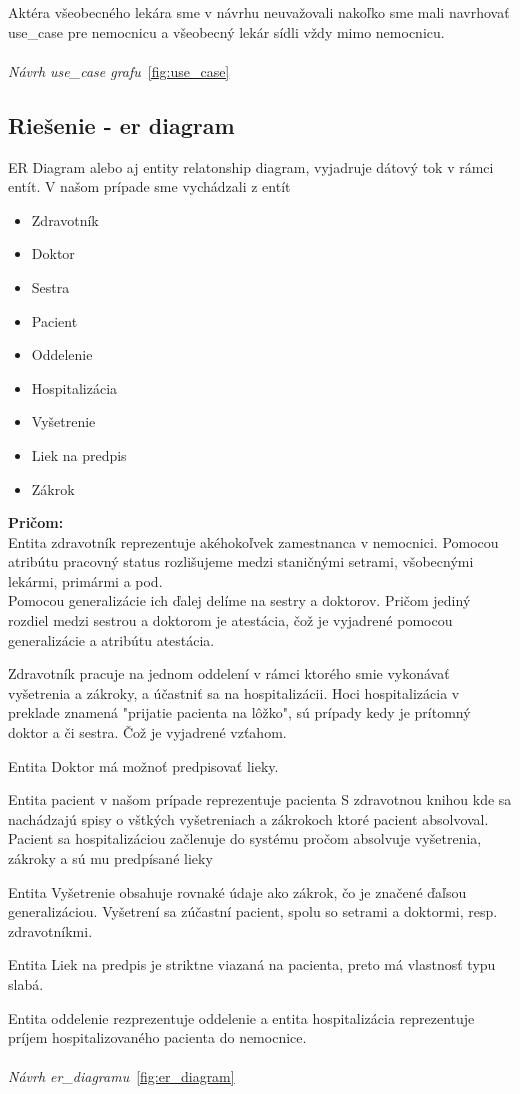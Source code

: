 Aktéra všeobecného lekára sme v návrhu neuvažovali nakoľko sme mali navrhovať use\_case pre nemocnicu a všeobecný lekár
sídli vždy mimo nemocnicu.
\\\\
\textit{Návrh use\_case grafu}~\ref{fig:use_case}

\subsection{Riešenie - er diagram}
ER Diagram alebo aj entity relatonship diagram, vyjadruje dátový tok v rámci entít.
V našom prípade sme vychádzali z entít

\begin{itemize}
    \item Zdravotník
    \item Doktor
    \item Sestra
    \item Pacient
    \item Oddelenie
    \item Hospitalizácia
    \item Vyšetrenie
    \item Liek na predpis
    \item Zákrok
\end{itemize}

\noindent\textbf{Pričom:} \\
\indent Entita zdravotník reprezentuje akéhokoľvek zamestnanca v nemocnici. Pomocou atribútu pracovný status rozlišujeme medzi staničnými setrami,
všobecnými lekármi, primármi a pod. \\
Pomocou generalizácie ich ďalej delíme na sestry a doktorov. Pričom jediný rozdiel medzi sestrou a doktorom je atestácia, čož
je vyjadrené pomocou generalizácie a atribútu atestácia.

Zdravotník pracuje na jednom oddelení v rámci ktorého smie vykonávať vyšetrenia a zákroky, a účastniť sa na hospitalizácii.
Hoci hospitalizácia v preklade znamená "prijatie pacienta na lôžko", sú prípady kedy je prítomný doktor a či sestra. Čož
je vyjadrené vzťahom.

Entita Doktor má možnoť predpisovať lieky.

Entita pacient v našom prípade reprezentuje pacienta S zdravotnou knihou kde sa nachádzajú spisy o vštkých vyšetreniach a zákrokoch ktoré pacient
absolvoval.
Pacient sa hospitalizáciou začlenuje do systému pročom absolvuje vyšetrenia, zákroky a sú mu predpísané lieky

Entita Vyšetrenie obsahuje rovnaké údaje ako zákrok, čo je značené ďaľsou generalizáciou.
Vyšetrení sa zúčastní pacient, spolu so setrami a doktormi, resp. zdravotníkmi.

Entita Liek na predpis je striktne viazaná na pacienta, preto má vlastnosť  typu slabá.

Entita oddelenie rezprezentuje oddelenie a entita hospitalizácia reprezentuje príjem hospitalizovaného pacienta do nemocnice.
\\\\
\textit{Návrh er\_diagramu}~\ref{fig:er_diagram}
\newpage


